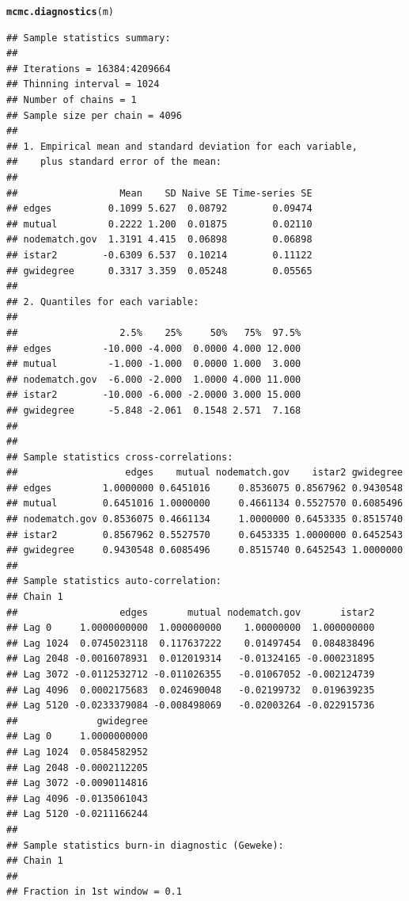 \documentclass[12pt, letterpaper, notitlepage, onecolumn, twoside, openbib]{article}\usepackage[]{graphicx}\usepackage[]{color}
\makeatletter
\newcommand{\hlstd}[1]{\textcolor[rgb]{0.345,0.345,0.345}{#1}}%
\newcommand{\hlkwd}[1]{\textcolor[rgb]{0.737,0.353,0.396}{\textbf{#1}}}%
\newenvironment{kframe}{%
 \def\at@end@of@kframe{}%
 \ifinner\ifhmode%
  \def\at@end@of@kframe{\end{minipage}}%
  \begin{minipage}{\columnwidth}%
 \fi\fi%
 \def\FrameCommand##1{\hskip\@totalleftmargin \hskip-\fboxsep
 \colorbox{shadecolor}{##1}\hskip-\fboxsep
     \hskip-\linewidth \hskip-\@totalleftmargin \hskip\columnwidth}%
 \MakeFramed {\advance\hsize-\width
   \@totalleftmargin\z@ \linewidth\hsize
   \@setminipage}}%
 {\par\unskip\endMakeFramed%
 \at@end@of@kframe}
\newenvironment{knitrout}{}{} %
\makeatother
\begin{document}
\begin{knitrout}
\color{fgcolor}\begin{kframe}
\begin{alltt}
\hlkwd{mcmc.diagnostics}\hlstd{(m)}
\end{alltt}
\begin{verbatim}
## Sample statistics summary:
## 
## Iterations = 16384:4209664
## Thinning interval = 1024 
## Number of chains = 1 
## Sample size per chain = 4096 
## 
## 1. Empirical mean and standard deviation for each variable,
##    plus standard error of the mean:
## 
##                  Mean    SD Naive SE Time-series SE
## edges          0.1099 5.627  0.08792        0.09474
## mutual         0.2222 1.200  0.01875        0.02110
## nodematch.gov  1.3191 4.415  0.06898        0.06898
## istar2        -0.6309 6.537  0.10214        0.11122
## gwidegree      0.3317 3.359  0.05248        0.05565
## 
## 2. Quantiles for each variable:
## 
##                  2.5%    25%     50%   75%  97.5%
## edges         -10.000 -4.000  0.0000 4.000 12.000
## mutual         -1.000 -1.000  0.0000 1.000  3.000
## nodematch.gov  -6.000 -2.000  1.0000 4.000 11.000
## istar2        -10.000 -6.000 -2.0000 3.000 15.000
## gwidegree      -5.848 -2.061  0.1548 2.571  7.168
## 
## 
## Sample statistics cross-correlations:
##                   edges    mutual nodematch.gov    istar2 gwidegree
## edges         1.0000000 0.6451016     0.8536075 0.8567962 0.9430548
## mutual        0.6451016 1.0000000     0.4661134 0.5527570 0.6085496
## nodematch.gov 0.8536075 0.4661134     1.0000000 0.6453335 0.8515740
## istar2        0.8567962 0.5527570     0.6453335 1.0000000 0.6452543
## gwidegree     0.9430548 0.6085496     0.8515740 0.6452543 1.0000000
## 
## Sample statistics auto-correlation:
## Chain 1 
##                  edges       mutual nodematch.gov       istar2
## Lag 0     1.0000000000  1.000000000    1.00000000  1.000000000
## Lag 1024  0.0745023118  0.117637222    0.01497454  0.084838496
## Lag 2048 -0.0016078931  0.012019314   -0.01324165 -0.000231895
## Lag 3072 -0.0112532712 -0.011026355   -0.01067052 -0.002124739
## Lag 4096  0.0002175683  0.024690048   -0.02199732  0.019639235
## Lag 5120 -0.0233379084 -0.008498069   -0.02003264 -0.022915736
##              gwidegree
## Lag 0     1.0000000000
## Lag 1024  0.0584582952
## Lag 2048 -0.0002112205
## Lag 3072 -0.0090114816
## Lag 4096 -0.0135061043
## Lag 5120 -0.0211166244
## 
## Sample statistics burn-in diagnostic (Geweke):
## Chain 1 
## 
## Fraction in 1st window = 0.1

\end{verbatim}
\end{kframe}
\end{knitrout}
\end{document}
